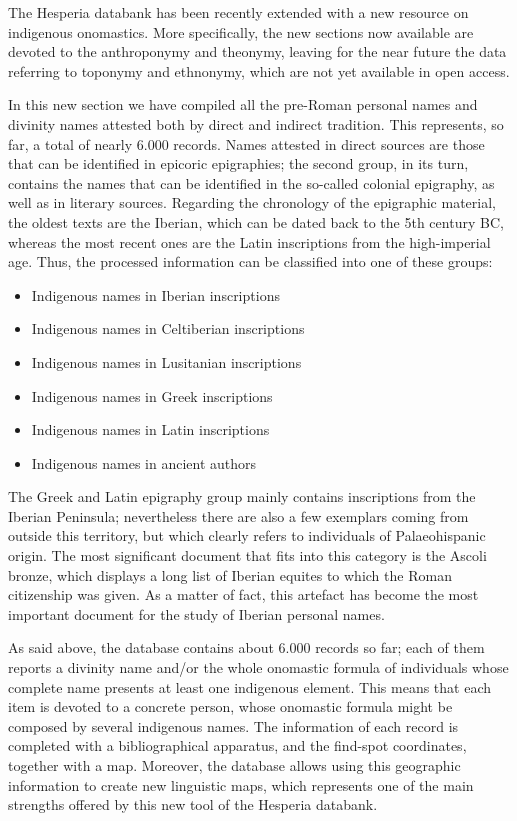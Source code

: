 \documentclass[amsthm,ebook]{saparticle}
\begin{document}
The Hesperia databank has been recently extended with a new resource on indigenous onomastics. More specifically, the
new sections now available are devoted to the anthroponymy and theonymy, leaving for the near future the data referring
to toponymy and ethnonymy, which are not yet available in open access.

In this new section we have compiled all the pre-Roman personal names and divinity names attested both by direct and
indirect tradition. This represents, so far, a total of nearly 6.000 records. Names attested in direct sources are
those that can be identified in epicoric epigraphies; the second group, in its turn, contains the names that can be
identified in the so-called colonial epigraphy, as well as in literary sources. Regarding the chronology of the
epigraphic material, the oldest texts are the Iberian, which can be dated back to the 5th century BC, whereas the most
recent ones are the Latin inscriptions from the high-imperial age. Thus, the processed information can be classified
into one of these groups:

\begin{itemize}
\item Indigenous names in Iberian inscriptions
\item Indigenous names in Celtiberian inscriptions 
\item Indigenous names in Lusitanian inscriptions
\item Indigenous names in Greek inscriptions
\item Indigenous names in Latin inscriptions
\item Indigenous names in ancient authors
\end{itemize}
The Greek and Latin epigraphy group mainly contains inscriptions from the Iberian Peninsula; nevertheless there are also
a few exemplars coming from outside this territory, but which clearly refers to individuals of Palaeohispanic origin.
The most significant document that fits into this category is the Ascoli bronze, which displays a long list of Iberian
equites to which the Roman citizenship was given. As a matter of fact, this artefact has become the most important
document for the study of Iberian personal names.

As said above, the database contains about 6.000 records so far; each of them reports a divinity name and/or the whole
onomastic formula of individuals whose complete name presents at least one indigenous element. This means that each
item is devoted to a concrete person, whose onomastic formula might be composed by several indigenous names. The
information of each record is completed with a bibliographical apparatus, and the find-spot coordinates, together with
a map. Moreover, the database allows using this geographic information to create new linguistic maps, which represents
one of the main strengths offered by this new tool of the Hesperia databank.
\end{document}
